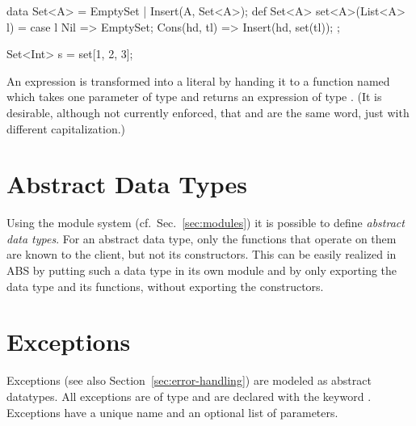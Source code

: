 \begin{absexample}
data Set<A> = EmptySet | Insert(A, Set<A>);
def Set<A> set<A>(List<A> l) = 
   case l {
      Nil => EmptySet;
      Cons(hd, tl) => Insert(hd, set(tl));
   } ;

{
  Set<Int> s = set[1, 2, 3];
}
\end{absexample}
An expression  is transformed into a literal by
handing it to a function named  which takes one parameter of
type  and returns an expression of type .  (It is
desirable, although not currently enforced, that  and
 are the same word, just with different capitalization.)

\section{Abstract Data Types}
\label{sec:abstract data types}
Using the module system (cf.~Sec.~\ref{sec:modules}) it is possible to define \emph{abstract data types}. For an abstract data type, only the functions that operate on them are known to the client, but not its constructors. This can be easily realized in ABS by putting such a data type in its own module and by only exporting the data type and its functions, without exporting the constructors.

\section{Exceptions}
\label{sec:exceptions}

Exceptions (see also Section~\ref{sec:error-handling}) are modeled as abstract
datatypes.  All exceptions are of type  and are
declared with the keyword .  Exceptions have a unique name and
an optional list of parameters.

\begin{abssyntax}
    {}\ \ 
\end{abssyntax}

